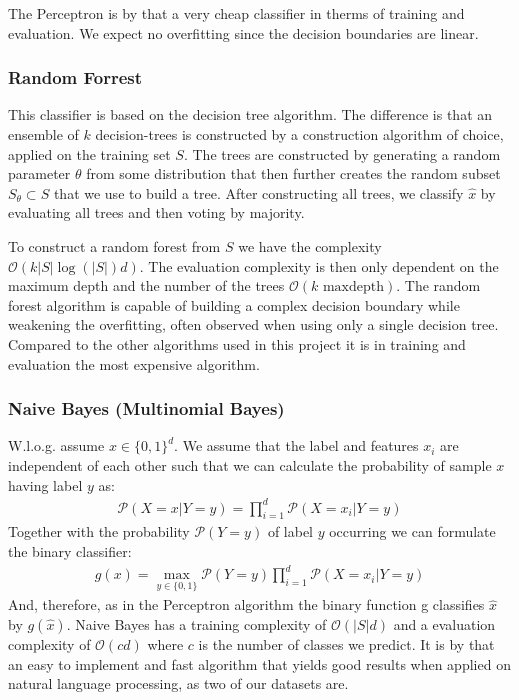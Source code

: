 \documentclass[11pt]{article}
\begin{document}
The Perceptron is by that a very cheap classifier in therms of training and evaluation. We expect no overfitting since the decision boundaries are linear.

\subsubsection{Random Forrest}\cite{shalev2014}
This classifier is based on the decision tree algorithm. The difference is that an ensemble of $k$ decision-trees is constructed by a construction algorithm of choice, applied on the training set $S$. The trees are constructed by generating a random parameter $\theta$ from some distribution that then further creates the random subset $S_{\theta}\subset S$ that we use to build a tree. After constructing all trees, we classify $\hat{x}$ by evaluating all trees and then voting by majority.

To construct a random forest from $S$ we have the complexity \cite{tsang2005} $\mathcal{O}(k|S|\log(|S|)d)$. The evaluation complexity is then only dependent on the maximum depth and the number of the trees \cite{tsang2005} $\mathcal{O}(k\text{ maxdepth})$.
The random forest algorithm is capable of building a complex decision boundary while weakening the overfitting, often observed when using only a single decision tree. Compared to the other algorithms used in this project it is in training and evaluation the most expensive algorithm.

\subsubsection{Naive Bayes (Multinomial Bayes)}\cite{shalev2014}
W.l.o.g. assume $x\in \{0,1\}^d$. We assume that the label and features $x_i$ are independent of each other such that we can calculate the probability of sample $x$ having label $y$ as:
\begin{align}
\mathcal{P}(X=x|Y=y) = \prod\limits_{i=1}^d\mathcal{P}(X=x_i|Y=y)
\end{align}
Together with the probability $\mathcal{P}(Y=y)$ of label $y$ occurring we can formulate the binary classifier:
\begin{align}
g(x) = \max\limits_{y\in\{0,1\}}\mathcal{P}(Y=y)\prod\limits_{i=1}^d\mathcal{P}(X=x_i|Y=y)
\end{align}
And, therefore, as in the Perceptron algorithm the binary function g classifies $\hat{x}$ by $g(\hat{x})$.
Naive Bayes has a training complexity of $\mathcal{O}(|S|d)$ and a evaluation complexity of $\mathcal{O}(cd)$ where $c$ is the number of classes we predict. It is by that an easy to implement and fast algorithm that yields good results when applied on natural language processing, as two of our datasets are.
\end{document}
